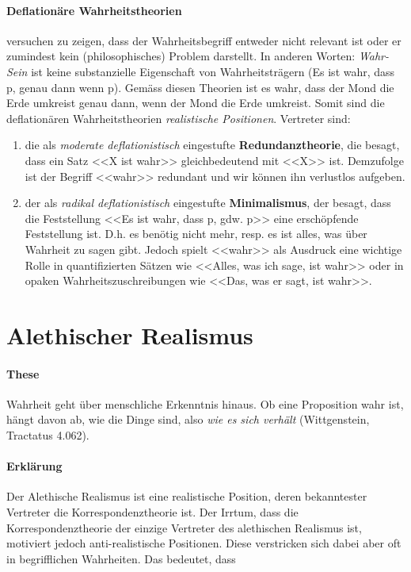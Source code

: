 \documentclass[../main.tex]{subfiles}
\begin{document}
\paragraph{Deflationäre Wahrheitstheorien} versuchen zu zeigen, dass der Wahrheitsbegriff entweder nicht relevant ist oder er zumindest kein (philosophisches) Problem darstellt. In anderen Worten: \textit{Wahr-Sein} ist keine substanzielle Eigenschaft von Wahrheitsträgern (Es ist wahr, dass p, genau dann wenn p). Gemäss diesen Theorien ist es wahr, dass der Mond die Erde umkreist genau dann, wenn der Mond die Erde umkreist. Somit sind die deflationären Wahrheitstheorien \textit{realistische Positionen}. Vertreter sind:
\begin{enumerate}[label=(\alph*)]
	\item die als \textit{moderate deflationistisch} eingestufte \textbf{Redundanztheorie}, die besagt, dass ein Satz <<X ist wahr>> gleichbedeutend mit <<X>> ist. Demzufolge ist der Begriff <<wahr>> redundant und wir können ihn verlustlos aufgeben. 
	\item der als \textit{radikal deflationistisch} eingestufte \textbf{Minimalismus}, der besagt, dass die Feststellung <<Es ist wahr, dass p, gdw. p>> eine erschöpfende Feststellung ist. D.h. es benötig nicht mehr, resp. es ist alles, was über Wahrheit zu sagen gibt. Jedoch spielt <<wahr>> als Ausdruck eine wichtige Rolle in quantifizierten Sätzen wie <<Alles, was ich sage, ist wahr>> oder in opaken Wahrheitszuschreibungen wie <<Das, was er sagt, ist wahr>>. 
\end{enumerate}

\section{Alethischer Realismus}
\paragraph{These} Wahrheit geht über menschliche Erkenntnis hinaus. Ob eine Proposition wahr ist, hängt davon ab, wie die Dinge sind, also \textit{wie es sich verhält} (Wittgenstein, Tractatus 4.062). 

\paragraph{Erklärung} Der Alethische Realismus ist eine realistische Position, deren bekanntester Vertreter die Korrespondenztheorie ist. Der Irrtum, dass die Korrespondenztheorie der einzige Vertreter des alethischen Realismus ist, motiviert jedoch anti-realistische Positionen. Diese verstricken sich dabei aber oft in begrifflichen Wahrheiten. Das bedeutet, dass 
\end{document}

